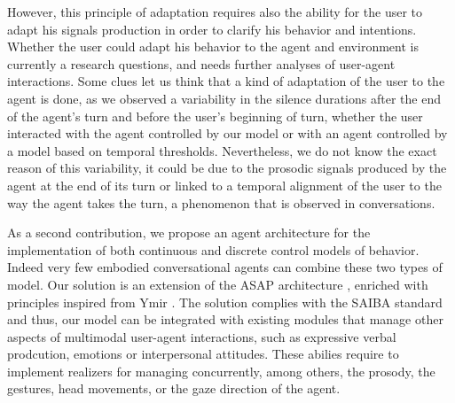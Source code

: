 However, this principle of adaptation requires also the ability for the user to adapt his signals production in order to clarify his behavior and intentions. Whether the user could adapt his behavior to the agent and environment is currently a research questions, and needs further analyses of user-agent interactions. 
Some clues let us think that a kind of adaptation of the user to the agent is done, as we observed a variability in the silence durations after the end of the agent's turn and before the user's beginning of turn, whether the user interacted with the agent controlled by our model or with an agent controlled by a model based on temporal thresholds. Nevertheless, we do not know the exact reason of this variability, it could be due to the prosodic signals produced by the agent at the end of its turn or linked to a temporal alignment of the user to the way the agent takes the turn, a phenomenon that is observed in conversations. 

As a second contribution, we propose an agent architecture for the implementation of both continuous and discrete control models of behavior. 
Indeed very few embodied conversational agents can combine these two types of model. 
Our solution is an extension of the ASAP architecture \cite{kopp_architecture_2014}, enriched with principles inspired from Ymir \citep{thorisson_mind_1999}. 
The solution complies with the SAIBA standard and thus, our model can be integrated with existing modules that manage other aspects of multimodal user-agent interactions, such as expressive verbal prodcution, emotions or interpersonal attitudes. These abilies require to implement realizers for managing concurrently, among others, the prosody, the gestures, head movements, or the gaze direction of the agent.


